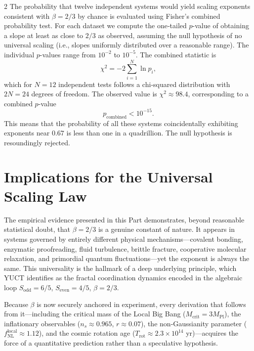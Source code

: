 \documentclass[12pt,a4paper]{article}
\begin{document}
\begin{multicols}{2}
		The probability that twelve independent systems would yield scaling exponents consistent with \(\beta = 2/3\) by chance is evaluated using Fisher's combined probability test. For each dataset we compute the one‑tailed \(p\)-value of obtaining a slope at least as close to \(2/3\) as observed, assuming the null hypothesis of no universal scaling (i.e., slopes uniformly distributed over a reasonable range). The individual \(p\)-values range from \(10^{-2}\) to \(10^{-5}\). The combined statistic is
		\[
		\chi^2 = -2\sum_{i=1}^{N} \ln p_i,
		\]
		which for \(N=12\) independent tests follows a chi‑squared distribution with \(2N = 24\) degrees of freedom. The observed value is \(\chi^2 \approx 98.4\), corresponding to a combined \(p\)-value
		\[
		p_{\mathrm{combined}} < 10^{-15}.
		\]
		This means that the probability of all these systems coincidentally exhibiting exponents near \(0.67\) is less than one in a quadrillion. The null hypothesis is resoundingly rejected.
		
		\section{Implications for the Universal Scaling Law}
		
		The empirical evidence presented in this Part demonstrates, beyond reasonable statistical doubt, that \(\beta = 2/3\) is a genuine constant of nature. It appears in systems governed by entirely different physical mechanisms—covalent bonding, enzymatic proofreading, fluid turbulence, brittle fracture, cooperative molecular relaxation, and primordial quantum fluctuations—yet the exponent is always the same. This universality is the hallmark of a deep underlying principle, which YUCT identifies as the fractal coordination dynamics encoded in the algebraic loop \(S_{\mathrm{odd}} = 6/5\), \(S_{\mathrm{even}} = 4/5\), \(\beta = 2/3\).
		
		Because \(\beta\) is now securely anchored in experiment, every derivation that follows from it—including the critical mass of the Local Big Bang (\(M_{\mathrm{crit}} = 3M_{\mathrm{Pl}}\)), the inflationary observables (\(n_s \approx 0.965\), \(r \approx 0.07\)), the non‑Gaussianity parameter (\(f_{\mathrm{NL}}^{\mathrm{local}} \approx 1.12\)), and the cosmic rotation age (\(T_{\mathrm{rot}} \approx 2.3\times10^{14}\) yr)—acquires the force of a quantitative prediction rather than a speculative hypothesis.
		
	\end{multicols}
	
\end{document}
